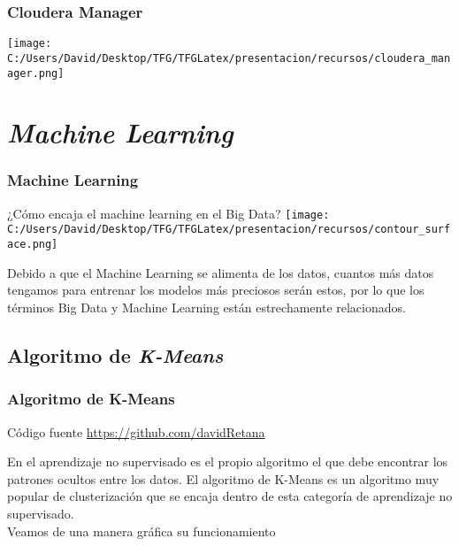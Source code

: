 \documentclass{beamer}
\begin{document}
\begin{frame}
  \frametitle{Cloudera Manager}
  \texttt{[image: C:/Users/David/Desktop/TFG/TFGLatex/presentacion/recursos/cloudera\_manager.png]}
\end{frame}

\section{\textit{Machine Learning}}

\begin{frame} %
\frametitle{Machine Learning}
¿Cómo encaja el machine learning en el Big Data?
\centering
\texttt{[image: C:/Users/David/Desktop/TFG/TFGLatex/presentacion/recursos/contour\_surface.png]}


Debido a que el Machine Learning se alimenta de los datos, cuantos más datos tengamos para entrenar los modelos más 
preciosos serán estos, por lo que los términos Big Data y Machine Learning están estrechamente relacionados.
\end{frame}


\subsection{Algoritmo de \textit{K-Means}}

\begin{frame}[fragile] %
\frametitle{Algoritmo de K-Means}
\begin{block}{Código fuente}
\url{https://github.com/davidRetana}
\end{block}
En el aprendizaje no supervisado es el propio algoritmo el que debe encontrar los patrones ocultos entre los datos.
El algoritmo de K-Means es un algoritmo muy popular de clusterización que se encaja dentro de esta categoría de 
aprendizaje no supervisado.\\
Veamos de una manera gráfica su funcionamiento
\end{frame}
\end{document}
